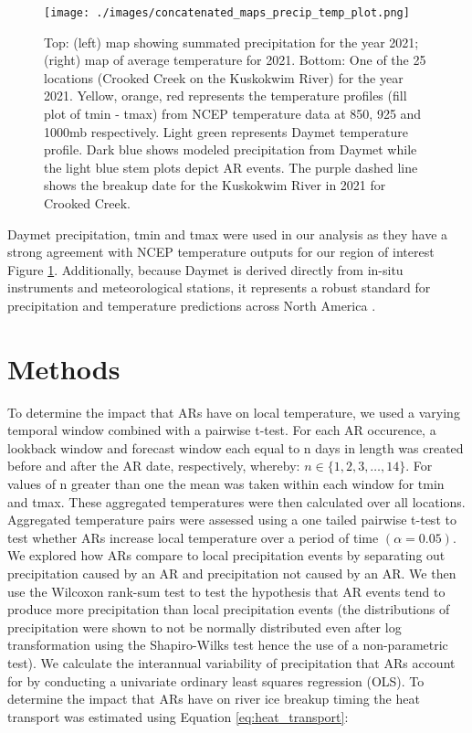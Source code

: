 \documentclass[draft]{AR_analysis_}
\begin{document}
\begin{figure}
\centering
\texttt{[image: ./images/concatenated\_maps\_precip\_temp\_plot.png]}
	\caption{Top: (left) map showing summated precipitation for the
	year 2021; (right) map of average temperature for 2021. Bottom:
	One of the 25 locations (Crooked Creek on the Kuskokwim
	River) for the year 2021. Yellow, orange, red represents the
	temperature profiles (fill plot of tmin - tmax) from NCEP
	temperature data at 850, 925 and 1000mb respectively. Light
	green represents Daymet temperature profile. Dark blue shows
	modeled precipitation from Daymet while the light blue stem
	plots depict AR events. The purple dashed line shows the breakup
	date for the Kuskokwim River in 2021 for Crooked Creek.}
\label{fig:concatenated_maps_precip_temp_plot} 
\end{figure}

Daymet precipitation, tmin and tmax were used in our analysis as they
have a strong agreement with NCEP temperature outputs for our region of interest
Figure \ref{fig:concatenated_maps_precip_temp_plot}. Additionally, 
because Daymet is derived directly from in-situ instruments 
and meteorological stations, it represents a robust 
standard for precipitation and temperature predictions across North
America \cite{daymet2021}.

\section{Methods}

To determine the impact that ARs have on local temperature, we used a
varying temporal window combined with a pairwise t-test. For each
AR occurence, a lookback window and forecast window each equal to n
days in length was created before and after the AR date, respectively,
whereby: $ n \in \{1, 2, 3, \ldots, 14\}$.
For values of n greater than one the mean was taken within each window
for tmin and tmax. These aggregated temperatures were then
calculated over all locations. Aggregated temperature pairs 
were assessed using a one tailed pairwise t-test to test
whether ARs increase local temperature over a period of time $(\alpha =
0.05)$. We explored how ARs compare to local precipitation events by
separating out precipitation caused by an AR and precipitation not
caused by an AR. We then use the Wilcoxon rank-sum test to test the hypothesis 
that AR events tend to produce more precipitation than local
precipitation events (the distributions of precipitation were shown to
not be normally distributed even after log transformation using the
Shapiro-Wilks test hence the use of a non-parametric test). We calculate
the interannual variability of precipitation that ARs account for by
conducting a univariate ordinary least squares regression (OLS). To
determine the impact that ARs have on river ice breakup timing the heat
transport was estimated using Equation \ref{eq:heat_transport}:
\end{document}
